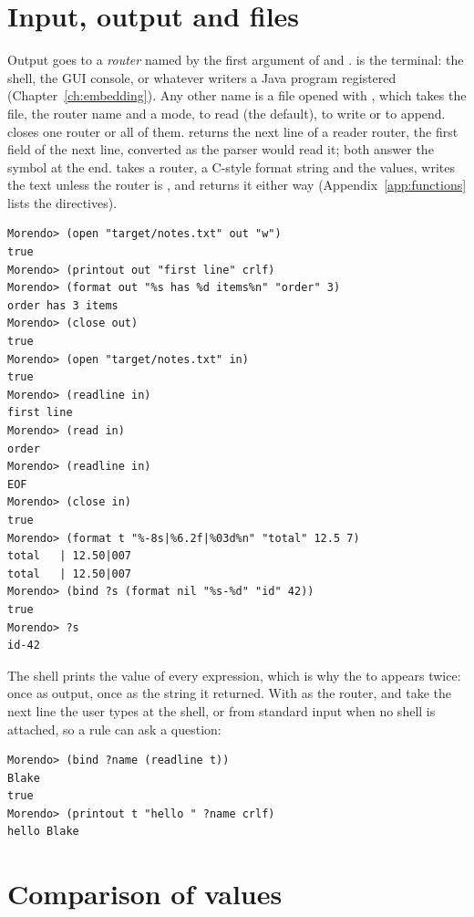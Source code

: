 \section{Input, output and files}
\label{sec:routers}

Output goes to a \emph{router} named by the first argument of
 and .  is the terminal: the shell, the
GUI console, or whatever writers a Java program registered
(Chapter~\ref{ch:embedding}). Any other name is a file opened with
, which takes the file, the router name and a mode,  to
read (the default),  to write or  to append. 
closes one router or all of them.  returns the next line of
a reader router,  the first field of the next line, converted
as the parser would read it; both answer the symbol  at the end.
 takes a router, a C-style format string and the values, writes
the text unless the router is , and returns it either way
(Appendix~\ref{app:functions} lists the directives).

\begin{lstlisting}[style=shell]
Morendo> (open "target/notes.txt" out "w")
true
Morendo> (printout out "first line" crlf)
Morendo> (format out "%s has %d items%n" "order" 3)
order has 3 items
Morendo> (close out)
true
Morendo> (open "target/notes.txt" in)
true
Morendo> (readline in)
first line
Morendo> (read in)
order
Morendo> (readline in)
EOF
Morendo> (close in)
true
Morendo> (format t "%-8s|%6.2f|%03d%n" "total" 12.5 7)
total   | 12.50|007
total   | 12.50|007
Morendo> (bind ?s (format nil "%s-%d" "id" 42))
true
Morendo> ?s
id-42
\end{lstlisting}

The shell prints the value of every expression, which is why the
 to  appears twice: once as output, once as the string
it returned. With  as the router,  and 
take the next line the user types at the shell, or from standard input
when no shell is attached, so a rule can ask a question:

\begin{lstlisting}[style=shell]
Morendo> (bind ?name (readline t))
Blake
true
Morendo> (printout t "hello " ?name crlf)
hello Blake
\end{lstlisting}

\section{Comparison of values}
\label{sec:comparison}

